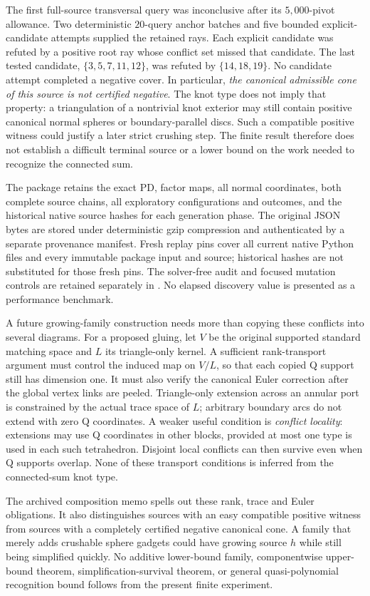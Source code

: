 The first full-source transversal query was inconclusive after its
$5{,}000$-pivot allowance.  Two deterministic $20$-query anchor batches
and five bounded explicit-candidate attempts supplied the retained
rays.  Each explicit candidate was refuted by a positive root ray
whose conflict set missed that candidate.  The last tested candidate,
$\{3,5,7,11,12\}$, was refuted by $\{14,18,19\}$.
No candidate attempt completed a negative cover.  In particular,
\emph{the canonical admissible cone of this source is not certified
negative}.  The knot type does not imply that property: a triangulation
of a nontrivial knot exterior may still contain positive canonical
normal spheres or boundary-parallel discs.  Such a compatible positive
witness could justify a later strict crushing step.  The finite result
therefore does not establish a difficult terminal source or a lower
bound on the work needed to recognize the connected sum.

The package  retains the exact
PD, factor maps, all normal coordinates, both complete source chains,
all exploratory configurations and outcomes, and the historical native
source hashes for each generation phase.  The original JSON bytes are
stored under deterministic gzip compression and authenticated by a
separate provenance manifest.  Fresh replay pins cover all current
native Python files and every immutable package input and source;
historical hashes are not substituted for those fresh pins.  The
solver-free audit and focused mutation controls are retained separately
in .  No elapsed discovery
value is presented as a performance benchmark.

A future growing-family construction needs more than copying these
conflicts into several diagrams.  For a proposed gluing, let $V$ be the
original supported standard matching space and $L$ its triangle-only
kernel.  A sufficient rank-transport argument must control the induced
map on $V/L$, so that each copied Q support still has dimension one.
It must also verify the canonical Euler correction after the global
vertex links are peeled.  Triangle-only extension across an annular
port is constrained by the actual trace space of $L$; arbitrary
boundary arcs do not extend with zero Q coordinates.  A weaker useful
condition is \emph{conflict locality}: extensions may use Q coordinates
in other blocks, provided at most one type is used in each such
tetrahedron.  Disjoint local conflicts can then survive even when Q
supports overlap.  None of these transport conditions is inferred
from the connected-sum knot type.

The archived composition memo spells out these rank, trace and Euler
obligations.  It also distinguishes sources with an easy compatible
positive witness from sources with a completely certified negative
canonical cone.  A family that merely adds crushable sphere gadgets
could have growing source $h$ while still being simplified quickly.
No additive lower-bound family, componentwise upper-bound theorem,
simplification-survival theorem, or general quasi-polynomial recognition
bound follows from the present finite experiment.
